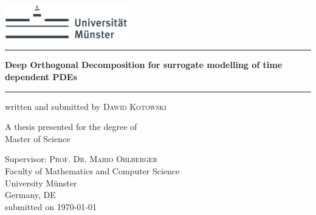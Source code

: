 \begin{titlepage}
\includegraphics[width=0.4\textwidth]{Figures/Logo.jpg} \hfill
    \begin{center}
        \vspace*{1cm}

        \hrule
        \vspace{0.5cm}
        
        \huge
        \textbf{Deep Orthogonal Decomposition for surrogate modelling of time dependent PDEs}

        \vspace{0.5cm}
        \hrule
        
        \vspace{0.5cm}
        
            
        \vspace{0.5cm}
        
        \Large    
        written and submitted by \textsc{Dawid Kotowski}
            
        \vfill
            
        A thesis presented for the degree of\\
        Master of Science
            
        \vspace{0.8cm}
            
            
        \Large
        Supervisor: \textsc{Prof. Dr. Mario Ohlberger} \\
        Faculty of Mathematics and Computer Science\\
        University Münster\\
        Germany, DE\\
        submitted on \today 
            
    \end{center}
\end{titlepage}